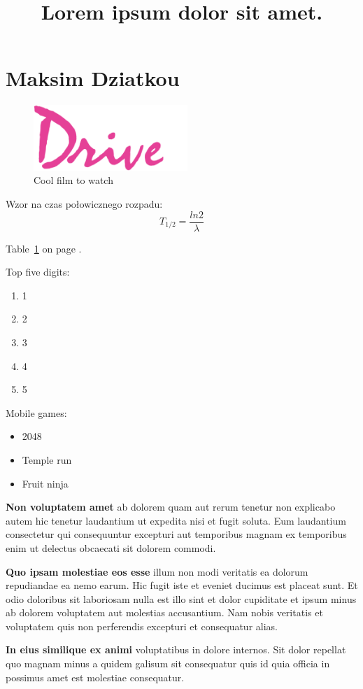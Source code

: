 \section{Maksim Dziatkou}
\label{sec:Maksim Dziaktou}

\begin{figure}[htbp]
    \centering
    \includegraphics[width = 220px]{pictures/drive.png}
    \caption{Cool film to watch}
    \label{fig:drive}
\end{figure}


Wzor na czas połowicznego rozpadu:
\[ T_{1/2}=\frac{ln2}{\lambda} \]


Table~\ref{sec:Maksim Dziaktou} on page \pageref{sec:Maksim Dziaktou}.


Top five digits:
\begin{enumerate}
    \item 1
    \item 2
    \item 3
    \item 4
    \item 5
\end{enumerate}

Mobile games:
\begin{itemize}
    \item 2048
    \item Temple run
    \item Fruit ninja
\end{itemize}

\newpage
\begin{flushleft}
\title{ \huge \textbf{Lorem ipsum dolor sit amet.}}
\vspace{0.2cm}
\par \textbf{Non voluptatem amet} ab dolorem quam aut rerum tenetur non explicabo autem hic tenetur laudantium ut expedita nisi et fugit soluta. Eum laudantium consectetur qui consequuntur excepturi aut temporibus magnam ex temporibus enim ut delectus obcaecati sit dolorem commodi. 
\vspace{0.2cm}
\par \textbf{Quo ipsam molestiae eos esse} illum non modi veritatis ea dolorum repudiandae ea nemo earum. Hic fugit iste et eveniet ducimus est placeat sunt. Et odio doloribus sit laboriosam nulla est illo sint et dolor cupiditate et ipsum minus ab dolorem voluptatem aut molestias accusantium. Nam nobis veritatis et voluptatem quis non perferendis excepturi et consequatur alias.
\vspace{0.2cm}
\par \textbf{In eius similique ex animi} voluptatibus in dolore internos. Sit dolor repellat quo magnam minus a quidem galisum sit consequatur quis id quia officia in possimus amet est molestiae consequatur.
\end{flushleft}